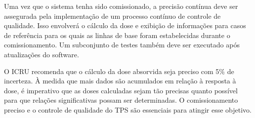 \documentclass[11pt,a4paper]{article}
\begin{document}
	Uma vez que o sistema tenha sido comissionado, a precisão contínua deve ser assegurada pela implementação de um processo contínuo de controle de qualidade. Isso envolverá o cálculo da dose e exibição de informações para casos de referência para os quais as linhas de base foram estabelecidas durante o comissionamento. Um subconjunto de testes também deve ser executado após atualizações do software.

	O ICRU recomenda que o cálculo da dose absorvida seja preciso com 5\% de incerteza. À medida que mais dados são acumulados em relação à resposta à dose, é imperativo que as doses calculadas sejam tão precisas quanto possível para que relações significativas possam ser determinadas. O comissionamento preciso e o controle de qualidade do TPS são essenciais para atingir esse objetivo.



\end{document}
